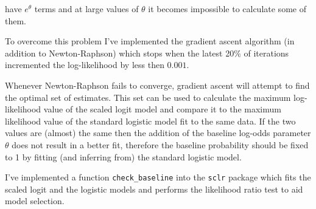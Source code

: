 \documentclass[
]{article}
\begin{document}
have \(e^\theta\) terms and at large values of \(\theta\) it becomes impossible to calculate some of them.

To overcome this problem I've implemented the gradient ascent algorithm (in addition to Newton-Raphson) which stops when the latest 20\% of iterations incremented the log-likelihood by less then \(0.001\).

Whenever Newton-Raphson fails to converge, gradient ascent will attempt to find the optimal set of estimates. This set can be used to calculate the maximum log-likelihood value of the scaled logit model and compare it to the maximum likelihood value of the standard logistic model fit to the same data. If the two values are (almost) the same then the addition of the baseline log-odds parameter \(\theta\) does not result in a better fit, therefore the baseline probability should be fixed to 1 by fitting (and inferring from) the standard logistic model.

I've implemented a function \texttt{check\_baseline} into the \texttt{sclr} package which fits the scaled logit and the logistic models and performs the likelihood ratio test to aid model selection.
\end{document}
